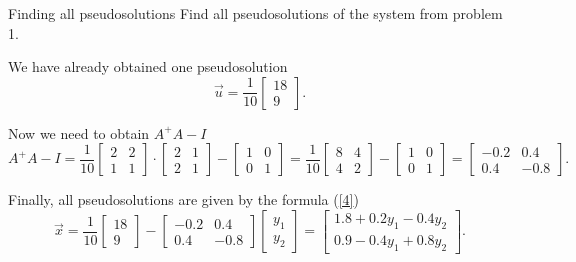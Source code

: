     \begin{problem}{Finding all pseudosolutions}  
        Find all pseudosolutions of the system from problem 1.
        \begin{solution}
            We have already obtained one pseudosolution
            \[
                \vec{u} = \dfrac{1}{10}\begin{bmatrix}
                    18\\
                    9
                \end{bmatrix}.  
            \]
            
            Now we need to obtain $A^+A-I$
            \[
                A^+A-I = \dfrac{1}{10} \begin{bmatrix}
                    2 & 2 \\
                    1 & 1
                \end{bmatrix} \cdot \begin{bmatrix}
                    2 & 1\\
                    2 & 1
                \end{bmatrix} - \begin{bmatrix}
                    1 & 0\\
                    0 & 1
                \end{bmatrix} = \dfrac{1}{10}\begin{bmatrix}
                    8 & 4 \\
                    4 & 2
                \end{bmatrix} - \begin{bmatrix}
                    1 & 0 \\
                    0 & 1
                \end{bmatrix} = \begin{bmatrix}
                    -0.2 & 0.4 \\
                    0.4 & -0.8
                \end{bmatrix}.
            \]
            
            Finally, all pseudosolutions are given by the formula (\ref{4})
            \[
                \vec{x} = \dfrac{1}{10}\begin{bmatrix}
                    18 \\ 9
                \end{bmatrix} - \begin{bmatrix}
                    -0.2 & 0.4\\
                    0.4 & -0.8
                \end{bmatrix}  \begin{bmatrix}
                    y_1 \\
                    y_2
                \end{bmatrix} = \begin{bmatrix}
                    1.8 + 0.2y_1 - 0.4 y_2\\
                    0.9 - 0.4y_1 + 0.8y_2
                \end{bmatrix}.
            \] 
        \end{solution}
    \end{problem}